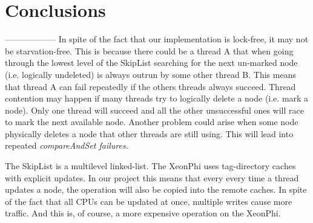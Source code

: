 \section{Conclusions}



------------------
In spite of the fact that our implementation is lock-free, it may not be starvation-free. 
This is because there could be a thread A that when going through the lowest level 
of the SkipList searching for the next un-marked node (i.e. logically undeleted) is always 
outrun by some other thread B. This means that thread A can fail repeatedly if the others
threads always succeed.
Thread contention may happen if many threads try to logically delete a node (i.e. mark
a node). Only one thread will succeed and all the other unsuccessful ones will race to mark 
the next available node. Another problem could arise when some node physically deletes a
node that other threads are still using. This will lead into repeated \it{compareAndSet} failures.

The SkipList is a multilevel linked-list. The XeonPhi uses tag-directory caches with explicit updates. 
In our project this means that every every time a thread updates a node, the operation will also be copied 
into the remote caches. In spite of the fact that all CPUs can be updated at once, multiple writes
cause more traffic. And this is, of course, a more expensive operation on the XeonPhi.
